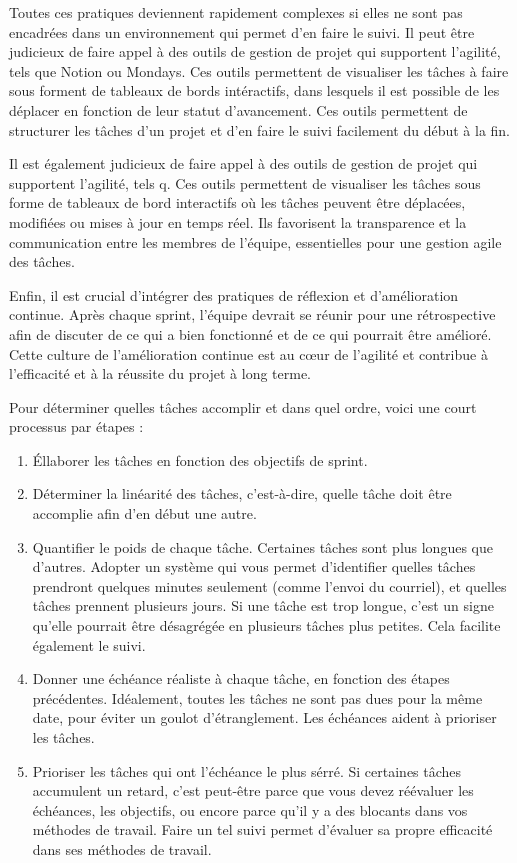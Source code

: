 \documentclass[
  letterpaper,
  DIV=11,
  numbers=noendperiod]{scrreprt}
\providecommand{\tightlist}{%
  \setlength{\itemsep}{0pt}\setlength{\parskip}{0pt}}\usepackage{longtable,booktabs,array}
\begin{document}
Toutes ces pratiques deviennent rapidement complexes si elles ne sont
pas encadrées dans un environnement qui permet d'en faire le suivi. Il
peut être judicieux de faire appel à des outils de gestion de projet qui
supportent l'agilité, tels que Notion ou Mondays. Ces outils permettent
de visualiser les tâches à faire sous forment de tableaux de bords
intéractifs, dans lesquels il est possible de les déplacer en fonction
de leur statut d'avancement. Ces outils permettent de structurer les
tâches d'un projet et d'en faire le suivi facilement du début à la fin.

Il est également judicieux de faire appel à des outils de gestion de
projet qui supportent l'agilité, tels q. Ces outils permettent de
visualiser les tâches sous forme de tableaux de bord interactifs où les
tâches peuvent être déplacées, modifiées ou mises à jour en temps réel.
Ils favorisent la transparence et la communication entre les membres de
l'équipe, essentielles pour une gestion agile des tâches.

Enfin, il est crucial d'intégrer des pratiques de réflexion et
d'amélioration continue. Après chaque sprint, l'équipe devrait se réunir
pour une rétrospective afin de discuter de ce qui a bien fonctionné et
de ce qui pourrait être amélioré. Cette culture de l'amélioration
continue est au cœur de l'agilité et contribue à l'efficacité et à la
réussite du projet à long terme.

Pour déterminer quelles tâches accomplir et dans quel ordre, voici une
court processus par étapes :

\begin{enumerate}
\def\labelenumi{\arabic{enumi}.}
\tightlist
\item
  Éllaborer les tâches en fonction des objectifs de sprint.
\item
  Déterminer la linéarité des tâches, c'est-à-dire, quelle tâche doit
  être accomplie afin d'en début une autre.
\item
  Quantifier le poids de chaque tâche. Certaines tâches sont plus
  longues que d'autres. Adopter un système qui vous permet d'identifier
  quelles tâches prendront quelques minutes seulement (comme l'envoi du
  courriel), et quelles tâches prennent plusieurs jours. Si une tâche
  est trop longue, c'est un signe qu'elle pourrait être désagrégée en
  plusieurs tâches plus petites. Cela facilite également le suivi.
\item
  Donner une échéance réaliste à chaque tâche, en fonction des étapes
  précédentes. Idéalement, toutes les tâches ne sont pas dues pour la
  même date, pour éviter un goulot d'étranglement. Les échéances aident
  à prioriser les tâches.
\item
  Prioriser les tâches qui ont l'échéance le plus sérré. Si certaines
  tâches accumulent un retard, c'est peut-être parce que vous devez
  réévaluer les échéances, les objectifs, ou encore parce qu'il y a des
  blocants dans vos méthodes de travail. Faire un tel suivi permet
  d'évaluer sa propre efficacité dans ses méthodes de travail.
\end{enumerate}
\end{document}
